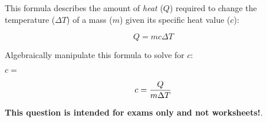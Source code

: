 

This formula describes the amount of {\it heat} ($Q$) required to change the temperature ($\Delta T$) of a mass ($m$) given its specific heat value ($c$):

$$Q = mc \Delta T$$

Algebraically manipulate this formula to solve for $c$:

\vskip 20pt

$c = $







$$c = {Q \over {m \Delta T}}$$







{\bf This question is intended for exams only and not worksheets!}.




